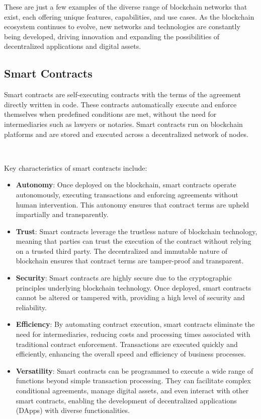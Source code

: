 These are just a few examples of the diverse range of blockchain networks that exist, each offering unique features, capabilities, and use cases. As the blockchain ecosystem continues to evolve, new networks and technologies are constantly being developed, driving innovation and expanding the possibilities of decentralized applications and digital assets.

\subsection{Smart Contracts}
\label{subsec:smart_contracts}

Smart contracts are self-executing contracts with the terms of the agreement directly written in code. These contracts automatically execute and enforce themselves when predefined conditions are met, without the need for intermediaries such as lawyers or notaries. Smart contracts run on blockchain platforms and are stored and executed across a decentralized network of nodes.

~

Key characteristics of smart contracts include:
\begin{itemize}
    \item \textbf{Autonomy}: Once deployed on the blockchain, smart contracts operate autonomously, executing transactions and enforcing agreements without human intervention. This autonomy ensures that contract terms are upheld impartially and transparently.
    \item \textbf{Trust}: Smart contracts leverage the trustless nature of blockchain technology, meaning that parties can trust the execution of the contract without relying on a trusted third party. The decentralized and immutable nature of blockchain ensures that contract terms are tamper-proof and transparent.
    \item \textbf{Security}: Smart contracts are highly secure due to the cryptographic principles underlying blockchain technology. Once deployed, smart contracts cannot be altered or tampered with, providing a high level of security and reliability.
    \item \textbf{Efficiency}: By automating contract execution, smart contracts eliminate the need for intermediaries, reducing costs and processing times associated with traditional contract enforcement. Transactions are executed quickly and efficiently, enhancing the overall speed and efficiency of business processes.
    \item \textbf{Versatility}: Smart contracts can be programmed to execute a wide range of functions beyond simple transaction processing. They can facilitate complex conditional agreements, manage digital assets, and even interact with other smart contracts, enabling the development of decentralized applications (DApps) with diverse functionalities.
\end{itemize}

